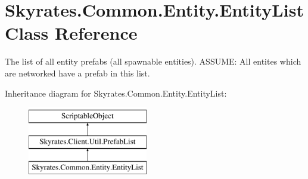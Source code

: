 \hypertarget{class_skyrates_1_1_common_1_1_entity_1_1_entity_list}{\section{Skyrates.\-Common.\-Entity.\-Entity\-List Class Reference}
\label{class_skyrates_1_1_common_1_1_entity_1_1_entity_list}
}


The list of all entity prefabs (all spawnable entities). A\-S\-S\-U\-M\-E\-: All entites which are networked have a prefab in this list.  


Inheritance diagram for Skyrates.\-Common.\-Entity.\-Entity\-List\-:\begin{figure}[H]
\begin{center}
\leavevmode
\includegraphics[height=3.000000cm]{class_skyrates_1_1_common_1_1_entity_1_1_entity_list}
\end{center}
\end{figure}
